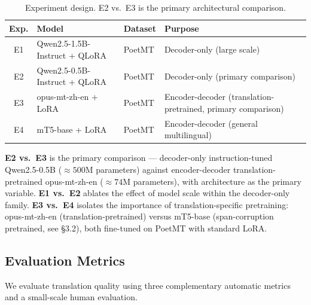 \begin{table}[htbp]
    \centering
    \caption{Experiment design. E2 vs.\ E3 is the primary architectural comparison.}
    \label{tab:experiments}
    \renewcommand{\arraystretch}{1.2}
    \begin{tabular}{@{}cp{3.8cm}p{2.5cm}p{4cm}@{}}
    \toprule
    \textbf{Exp.} & \textbf{Model} & \textbf{Dataset} & \textbf{Purpose} \\
    \midrule
    E1 & Qwen2.5-1.5B-Instruct + QLoRA & PoetMT
       & Decoder-only (large scale) \\
    E2 & Qwen2.5-0.5B-Instruct + QLoRA & PoetMT
       & Decoder-only (primary comparison) \\
    E3 & opus-mt-zh-en + LoRA           & PoetMT
       & Encoder-decoder (translation-pretrained, primary comparison) \\
    E4 & mT5-base + LoRA               & PoetMT
       & Encoder-decoder (general multilingual) \\
    \bottomrule
    \end{tabular}
\end{table}

\noindent
\textbf{E2 vs.\ E3} is the primary comparison --- decoder-only instruction-tuned
Qwen2.5-0.5B ($\approx500$M parameters) against encoder-decoder translation-pretrained
opus-mt-zh-en ($\approx74$M parameters), with architecture as the primary variable.
\textbf{E1 vs.\ E2} ablates the effect of model scale within the decoder-only family.
\textbf{E3 vs.\ E4} isolates the importance of translation-specific pretraining: opus-mt-zh-en (translation-pretrained) versus mT5-base (span-corruption pretrained, see \S3.2), both fine-tuned on PoetMT with standard LoRA.

\subsection{Evaluation Metrics}

We evaluate translation quality using three complementary automatic
metrics and a small-scale human evaluation.


